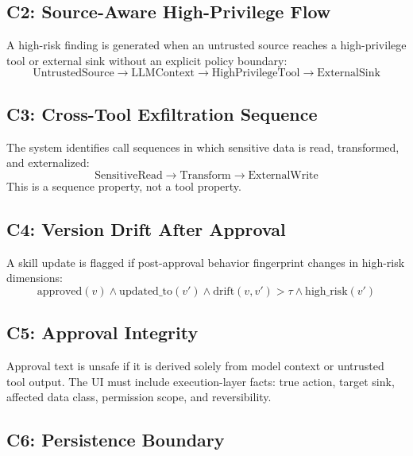 \documentclass[10pt]{article}
\begin{document}
\subsection{C2: Source-Aware High-Privilege Flow}

A high-risk finding is generated when an untrusted source reaches a high-privilege tool or external sink without an explicit policy boundary:
\begin{equation}
\text{UntrustedSource} \rightarrow \text{LLMContext} \rightarrow \text{HighPrivilegeTool} \rightarrow \text{ExternalSink}
\end{equation}

\subsection{C3: Cross-Tool Exfiltration Sequence}

The system identifies call sequences in which sensitive data is read, transformed, and externalized:
\begin{equation}
\text{SensitiveRead} \rightarrow \text{Transform} \rightarrow \text{ExternalWrite}
\end{equation}
This is a sequence property, not a tool property.

\subsection{C4: Version Drift After Approval}

A skill update is flagged if post-approval behavior fingerprint changes in high-risk dimensions:
\begin{equation}
\text{approved}(v) \wedge \text{updated\_to}(v') \wedge \text{drift}(v,v') > \tau \wedge \text{high\_risk}(v')
\end{equation}

\subsection{C5: Approval Integrity}

Approval text is unsafe if it is derived solely from model context or untrusted tool output. The UI must include execution-layer facts: true action, target sink, affected data class, permission scope, and reversibility.

\subsection{C6: Persistence Boundary}
\end{document}
